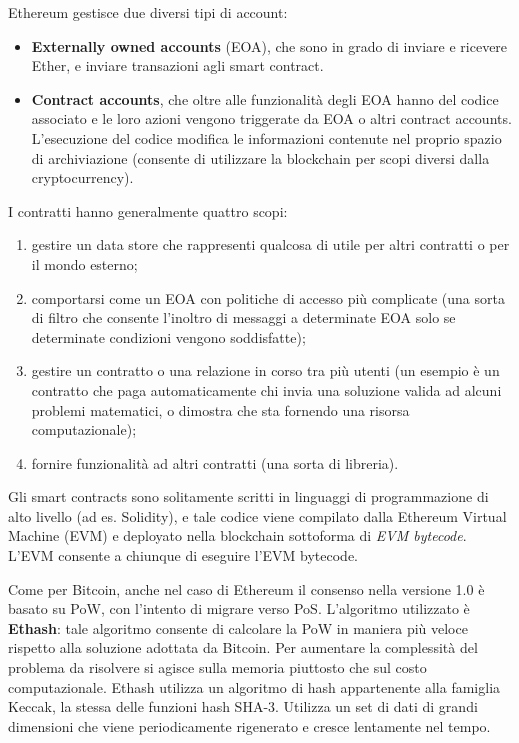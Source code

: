 Ethereum gestisce due diversi tipi di account:
\begin{itemize}
    \item \textbf{Externally owned accounts} (EOA), che sono in grado di inviare e ricevere Ether, e inviare transazioni agli smart contract.
    \item \textbf{Contract accounts}, che oltre alle funzionalità degli EOA hanno del codice associato e le loro azioni vengono triggerate da EOA o altri contract accounts. L'esecuzione del codice modifica le informazioni contenute nel proprio spazio di archiviazione (consente di utilizzare la blockchain per scopi diversi dalla cryptocurrency).
\end{itemize}
I contratti hanno generalmente quattro scopi:
\begin{enumerate}
    \item gestire un data store che rappresenti qualcosa di utile per altri contratti o per il mondo esterno;
    \item comportarsi come un EOA con politiche di accesso più complicate (una sorta di filtro che consente l'inoltro di messaggi a determinate EOA solo se determinate condizioni vengono soddisfatte);
    \item gestire un contratto o una relazione in corso tra più utenti (un esempio è un contratto che paga automaticamente chi invia una soluzione valida ad alcuni problemi matematici, o dimostra che sta fornendo una risorsa computazionale);
    \item fornire funzionalità ad altri contratti (una sorta di libreria).
\end{enumerate}
Gli smart contracts sono solitamente scritti in linguaggi di programmazione di alto livello (ad es. Solidity), e tale codice viene compilato dalla Ethereum Virtual Machine (EVM) e deployato nella blockchain sottoforma di \textit{EVM bytecode}. L'EVM consente a chiunque di eseguire l'EVM bytecode.


Come per Bitcoin, anche nel caso di Ethereum il consenso nella versione 1.0 è basato su PoW, con l'intento di migrare verso PoS. L'algoritmo utilizzato è \textbf{Ethash}: tale algoritmo consente di calcolare la PoW in maniera più veloce rispetto alla soluzione adottata da Bitcoin. Per aumentare la complessità del problema da risolvere si agisce sulla memoria piuttosto che sul costo computazionale. Ethash utilizza un algoritmo di hash appartenente alla famiglia Keccak, la stessa delle funzioni hash SHA-3. Utilizza un set di dati di grandi dimensioni che viene periodicamente rigenerato e cresce lentamente nel tempo.

